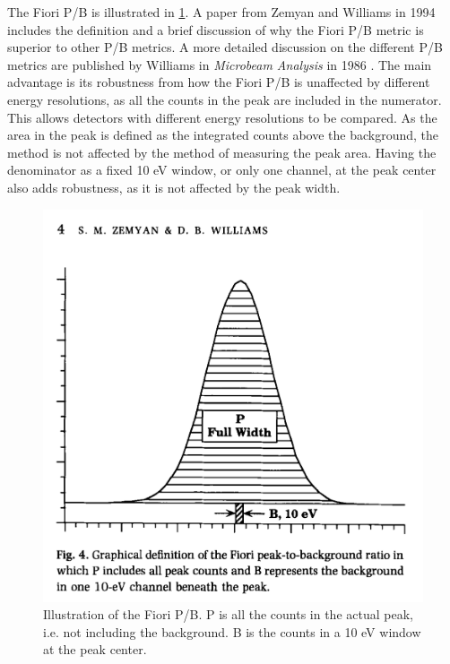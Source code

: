The Fiori P/B is illustrated in \cref{fig:fiori_pb}.
A paper from Zemyan and Williams in 1994 \cite{zemyan_standard_performance_1994} includes the definition and a brief discussion of why the Fiori P/B metric is superior to other P/B metrics.
A more detailed discussion on the different P/B metrics are published by Williams in \emph{Microbeam Analysis} in 1986 \cite{williams_standard_definitions_1986}.
The main advantage is its robustness from how the Fiori P/B is unaffected by different energy resolutions, as all the counts in the peak are included in the numerator.
This allows detectors with different energy resolutions to be compared.
As the area in the peak is defined as the integrated counts above the background, the method is not affected by the method of measuring the peak area.
Having the denominator as a fixed 10 eV window, or only one channel, at the peak center also adds robustness, as it is not affected by the peak width.




\begin{figure}
    \centering
    \includegraphics[width=0.6\linewidth]{figures/FioriPB_TODO_remake.png}
    \caption{Illustration of the Fiori P/B.
        P is all the counts in the actual peak, i.e. not including the background.
        B is the counts in a 10 eV window at the peak center.
        }
    \label{fig:fiori_pb}
\end{figure}


